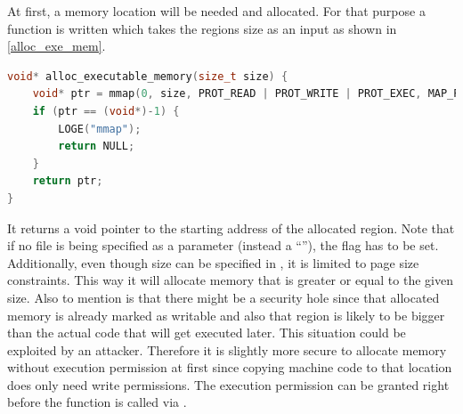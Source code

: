 At first, a memory location will be needed and allocated.
For that purpose a function is written which takes the regions size as an input as shown in \autoref{alloc_exe_mem}.\newpage
\begin{lstlisting}[language=C++, caption=alloc\_executable\_memory(), label=alloc_exe_mem]
void* alloc_executable_memory(size_t size) {
    void* ptr = mmap(0, size, PROT_READ | PROT_WRITE | PROT_EXEC, MAP_PRIVATE | MAP_ANONYMOUS, -1, 0);
    if (ptr == (void*)-1) {
        LOGE("mmap");
        return NULL;
    }
    return ptr;
}
\end{lstlisting}
It returns a void pointer to the starting address of the allocated region. Note that
if no file is being specified as a  parameter (instead a ``''),
the  flag has to be set. Additionally, even though size can be specified in , it is limited to page size constraints. This way it will allocate
memory that is greater or equal to the given size. Also to mention is that there might be a security hole since that allocated memory is already marked as writable
and also that region is likely to be bigger than the actual code that will get
executed later. This situation could be exploited by an attacker. Therefore it is slightly more secure to allocate memory without execution permission at first since copying machine code to that location does only need write
permissions. The execution permission can be granted right before the function is called via .

